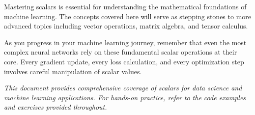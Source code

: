 \documentclass[11pt,a4paper]{article}
\begin{document}
Mastering scalars is essential for understanding the mathematical foundations of machine learning. The concepts covered here will serve as stepping stones to more advanced topics including vector operations, matrix algebra, and tensor calculus.

As you progress in your machine learning journey, remember that even the most complex neural networks rely on these fundamental scalar operations at their core. Every gradient update, every loss calculation, and every optimization step involves careful manipulation of scalar values.

\vspace{1cm}

\textit{This document provides comprehensive coverage of scalars for data science and machine learning applications. For hands-on practice, refer to the code examples and exercises provided throughout.}
\end{document}
